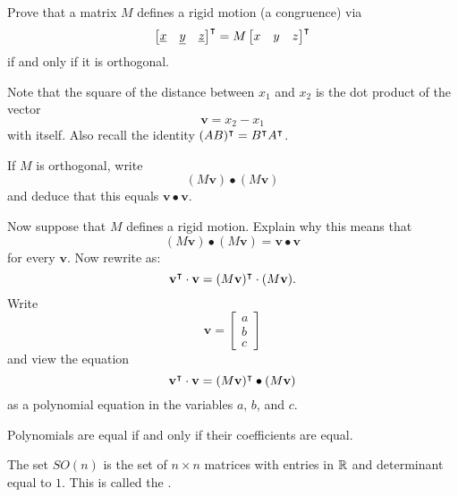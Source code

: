 \documentclass{ximera}
\begin{document}
\begin{exercise}
  Prove that a matrix $ M$ defines a rigid motion (a congruence)
  via
  \[
  \begin{bmatrix}
    \underline{x} & \underline{y} & \underline{z}%
  \end{bmatrix}^\transpose
  = M \begin{bmatrix} x & y & z\end{bmatrix}^\transpose
  \]
  if and only if it is orthogonal.

  \begin{hint}
    Note that the square of the distance between $x_{1}$ and
    $x_{2}$ is the dot product of the vector%
    \[
    {\mathbf v}=x_{2}-x_{1}%
    \]
    with itself.  Also recall the identity $(AB)^\intercal=B^\intercal A^\intercal$.
  \end{hint}
  \begin{hint}
    If $ M$ is orthogonal, write
    \[
    ( M{\mathbf v}) \bullet ( M{\mathbf v})
    \]
    and deduce that this equals ${\mathbf v}\bullet{\mathbf v}$. 
  \end{hint}
  \begin{hint}
    Now suppose that $ M$ defines a rigid motion. Explain why this means
    that
    \[
    ( M{\mathbf v}) \bullet ( M{\mathbf v})=
    {\mathbf v} \bullet {\mathbf v}
    \]
    for every ${\mathbf v}$.  Now rewrite as:
    \[
    {\mathbf v}^\intercal \cdot{\mathbf v}
    =( M{\mathbf v})^\intercal \cdot ( M{\mathbf v}).
    \]
    Write
    \[
    {\mathbf v} =
    \begin{bmatrix}
      a \\ b \\ c
    \end{bmatrix}
    \]
     and view the equation 
    \[
    {\mathbf v}^\intercal \cdot{\mathbf v}
    =( M{\mathbf v})^\intercal \bullet ( M{\mathbf v})
    \]
    as a polynomial equation in the variables $a$, $b$, and $c$. 
  \end{hint}
  \begin{hint}
    Polynomials are equal if and only if their coefficients are equal. 
  \end{hint}
\end{exercise}





\begin{definition}
  The set $SO(n)$ is the set of $n\times n$ matrices with entries in
  $\mathbb R$ and determinant equal to $1$. This is called the .
\end{definition}
\end{document}
